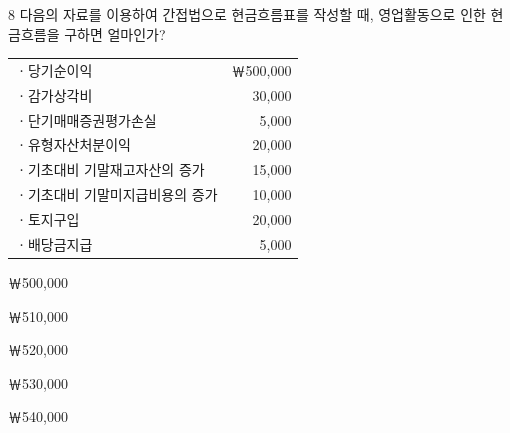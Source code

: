 \begin{question}{8}
다음의 자료를 이용하여 간접법으로 현금흐름표를 작성할 때, 영업활동으로 인한 현금흐름을 구하면 얼마인가?

{\small\centering
\begin{tabular}{@{}l r@{}}
\hline
ㆍ당기순이익 & ￦500,000 \\
ㆍ감가상각비 & 30,000 \\
ㆍ단기매매증권평가손실 & 5,000 \\
ㆍ유형자산처분이익 & 20,000 \\
ㆍ기초대비 기말재고자산의 증가 & 15,000 \\
ㆍ기초대비 기말미지급비용의 증가 & 10,000 \\
ㆍ토지구입 & 20,000 \\
ㆍ배당금지급 & 5,000 \\
\hline
\end{tabular}\par}
\begin{choices}
  \item ￦500,000
  \item ￦510,000
  \item ￦520,000
  \item ￦530,000
  \item ￦540,000
\end{choices}
\end{question}
